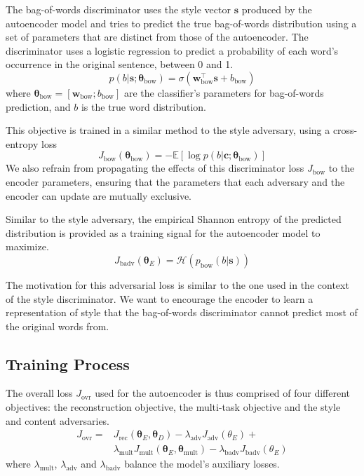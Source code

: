 \documentclass[11pt,a4paper]{article}
\newcommand{\loss}[1]{J_\text{#1}}
\begin{document}
The bag-of-words discriminator uses the style vector $\bm s$ produced by the autoencoder model and tries to predict the true bag-of-words distribution using a set of parameters that are distinct from those of the autoencoder. The discriminator uses a logistic regression to predict a probability of each word's occurrence in the original sentence, between 0 and 1.
\begin{equation}
	p(b | \bm s; \bm\theta_\text{bow}) = \sigma(\bm w_\text{bow}^\top \bm s + b_\text{bow})
\end{equation}
where $\bm\theta_\text{bow}=[\bm w_\text{bow}; b_\text{bow}]$ are the classifier's parameters for bag-of-words prediction, and $b$ is the true word distribution.

This objective is trained in a similar method to the style adversary, using a cross-entropy loss
\begin{equation} \label{eqn:adv-bow-disc-loss}
	\loss{bow}(\bm\theta_\text{bow}) =
	- \mathbb{E} [\log p(b | \bm c; \bm\theta_\text{bow})]
\end{equation}
We also refrain from propagating the effects of this discriminator loss $\loss{bow}$ to the encoder parameters, ensuring that the parameters that each adversary and the encoder can update are mutually exclusive.

Similar to the style adversary, the empirical Shannon entropy of the predicted distribution is provided as a training signal for the autoencoder model to maximize.
\begin{equation}
	\loss{badv}(\bm\theta_E) = \mathcal{H}(p_\text{bow}(b | \bm s))
\end{equation}

The motivation for this adversarial loss is similar to the one used in the context of the style discriminator. We want to encourage the encoder to learn a representation of style that the bag-of-words discriminator cannot predict most of the original words from.

\subsection{Training Process}

The overall loss $\loss{ovr}$ used for the autoencoder is thus comprised of four different objectives: the reconstruction objective, the multi-task objective and the style and content adversaries.
\begin{align*}
	\loss{ovr} =
	 & \loss{rec}(\bm\theta_E, \bm\theta_D) - \lambda_\text{adv} \loss{adv}(\theta_E) +                                \\
	 & \lambda_\text{mult} \loss{mult} (\bm\theta_E,\bm\theta_\text{mult}) - \lambda_\text{badv} \loss{badv}(\theta_E)
\end{align*}
where $\lambda_\text{mult}$, $\lambda_\text{adv}$ and $\lambda_\text{badv}$ balance the model's auxiliary losses.
\end{document}
